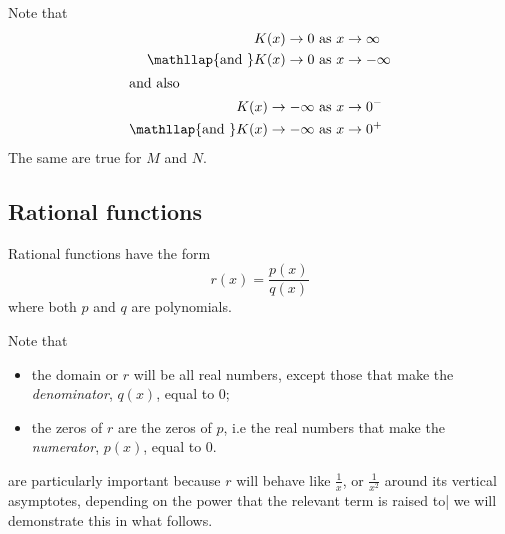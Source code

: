 \begin{doyouunderstand}
\begin{problem}
\begin{subproblem}
\begin{shortsolution}

    Note that
    \begin{align*}
        K(x)\rightarrow 0                           & \text{ as } x\rightarrow\infty\\
        \mathllap{\text{and }}    K(x)\rightarrow 0 &\text{ as } x\rightarrow-\infty\\
        \intertext{and also}
        K(x)\rightarrow -\infty     & \text{ as } x\rightarrow 0^-\\
        \mathllap{\text{and }}   K(x)\rightarrow -\infty &\text{ as } x\rightarrow 0^+
    \end{align*}
    The same are true for $M$ and $N$.
    \end{shortsolution}
\end{subproblem}
\end{problem}
\end{doyouunderstand}

\subsection*{Rational functions}
\begin{pccdefinition}\label{rat:def:function}
Rational functions have the form
\[
    r(x) = \frac{p(x)}{q(x)}
\]
where both $p$ and $q$ are polynomials. 

Note that
\begin{itemize}
 \item the domain or $r$ will be all real numbers, except those that
  make the \emph{denominator}, $q(x)$, equal to $0$;
 \item the zeros of $r$ are the zeros of $p$, i.e the real numbers
  that make the \emph{numerator}, $p(x)$, equal to $0$.
\end{itemize}

 are particularly important because $r$ 
will behave like $\frac{1}{x}$, or $\frac{1}{x^2}$ around its vertical asymptotes, 
depending on the power that the relevant term is raised to| we will demonstrate 
this in what follows.
\end{pccdefinition}

